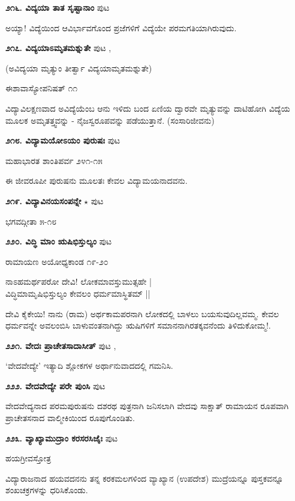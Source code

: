 {\medskip
\noindent\textbf{೨೧೬. ವಿದ್ಯಯಾ ತಾತ ಸೃಷ್ಟಾನಾಂ} \hfill ಪುಟ \pageref{133}

ಅಯ್ಯಾ! ವಿದ್ಯೆಯಿಂದ ಆವಿರ್ಭಾವಗೊಂದ ಪ್ರಜೆಗಳಿಗೆ ವಿದ್ಯೆಯೇ ಪರಮಗತಿಯಾಗಿರುವುದು.

\medskip
\noindent\textbf{೨೧೭. ವಿದ್ಯಯಾಽಮೃತಮಶ್ನುತೇ} \hfill ಪುಟ \pageref{99},\pageref{133}

(ಅವಿದ್ಯಯಾ ಮೃತ್ಯುಂ ತೀರ್ತ್ವಾ ವಿದ್ಯಯಾಮೃತಮಶ್ನುತೇ)

\hfill ಈಶಾವಾಸ್ಯೋಪನಿಷತ್ ೧೧

ವಿದ್ಯಾವಿಲಕ್ಷಣವಾದ ಅವಿದ್ಯೆಯೆಂಬ ಆನು ಇಳಿದು ಬಂದ ಏಣಿಯ ದ್ವಾರವೇ ಮೃತ್ಯುವನ್ನು ದಾಟಿಹೋಗಿ ವಿದ್ಯೆಯ ಮೂಲಕ ಅಮೃತತ್ತ್ವವನ್ನು - ನೈಜಸ್ವರೂಪವನ್ನು ಪಡೆಯುತ್ತಾನೆ. (ಸಂಸಾರಿಜೀವನು)

\medskip
\noindent\textbf{೨೧೮. ವಿದ್ಯಾಮಯೋಽಯಂ ಪುರುಷಃ} \hfill ಪುಟ \pageref{133}

\hfill ಮಹಾಭಾರತ ಶಾಂತಿಪರ್ವ ೨೪೧-೧೫

ಈ ಜೀವರೂಪೀ ಪುರುಷನು ಮೂಲತಃ ಕೇವಲ ವಿದ್ಯಾಮಯನಾದವನು.

\medskip
\noindent\textbf{೨೧೯. ವಿದ್ಯಾವಿನಯಸಂಪನ್ನೇ} $\star$ \hfill ಪುಟ \pageref{67}

\hfill ಭಗವದ್ಗೀತಾ ೫-೧೮

\medskip
\noindent\textbf{೨೨೦. ವಿದ್ಧಿ ಮಾಂ ಋಷಿಭಿಸ್ತುಲ್ಯಂ} \hfill ಪುಟ \pageref{151}

\hfill ರಾಮಾಯಣ ಅಯೋಧ್ಯಕಾಂಡ ೧೯-೨೦

\begin{shloka}
ನಾಽಹಮರ್ಥಪರೋ ದೇವಿ! ಲೋಕಮಾವಸ್ತುಮುತ್ಸಹೇ |\\
ವಿದ್ಧಿಮಾಮೃಷಿಭಿಸ್ತುಲ್ಯಂ ಕೇವಲಂ ಧರ್ಮಮಾಸ್ಥಿತಮ್ ||
\end{shloka}

ದೇವಿ ಕೈಕೇಯಿ! ನಾನು (ರಾಮ) ಅರ್ಥಕಾಮಪರನಾಗಿ ಲೋಕದಲ್ಲಿ ಬಾಳಲು ಬಯಸುವುದಿಲ್ಲವಮ್ಮ. ಕೇವಲ ಧರ್ಮವನ್ನೇ ಅವಲಂಬಿಸಿ ಬಾಳುವಂತನಾಗಿದ್ದು ಋಷಿಗಳಿಗೆ ಸಮಾನನಾಗಿರತಕ್ಕವನೆಂದು ತಿಳಿದುಕೋಮ್ಮ!.

\medskip
\noindent\textbf{೨೨೧. ವೇದಃ ಪ್ರಾಚೇತಸಾದಾಸೀತ್} \hfill ಪುಟ \pageref{228},\pageref{232}

`ವೇದವೇದ್ಯೇ' ಇತ್ಯಾದಿ ಶ್ಲೋಕಗಳ ಅರ್ಥಾನುವಾದದಲ್ಲಿ ಗಮನಿಸಿ.

\medskip
\noindent\textbf{೨೨೨. ವೇದವೇದ್ಯೇ ಪರೇ ಪುಂಸಿ} \hfill ಪುಟ \pageref{168}

ವೇದವೇದ್ಯನಾದ ಪರಮಪುರುಷನು ದಶರಥ ಪುತ್ರನಾಗಿ ಜನಿಸಲಾಗಿ ವೇದವು ಸಾಕ್ಷಾತ್ ರಾಮಾಯನ ರೂಪವಾಗಿ ಪ್ರಾಚೇತಸನಾದ ವಾಲ್ಮೀಕಿಯಿಂದ ರೂಪುಗೊಂಡಿತು.

\medskip
\noindent\textbf{೨೨೩. ವ್ಯಾಖ್ಯಾಮುದ್ರಾಂ ಕರಸರಸಿಜೈಃ} \hfill ಪುಟ \pageref{100}

\hfill ಹಯಗ್ರೀವಸ್ತೋತ್ರ

ವಿದ್ಯಾರಾಜನಾದ ಹಯವದನನು ತನ್ನ ಕರಕಮಲಗಳಿಂದ ವ್ಯಾಖ್ಯಾನ (ಉಪದೇಶ) ಮುದ್ರೆಯನ್ನೂ ಪುಸ್ತಕವನ್ನೂ ಶಂಖಚಕ್ರಗಳನ್ನು ಧರಿಸಿಕೊಂಡು.
 
}
